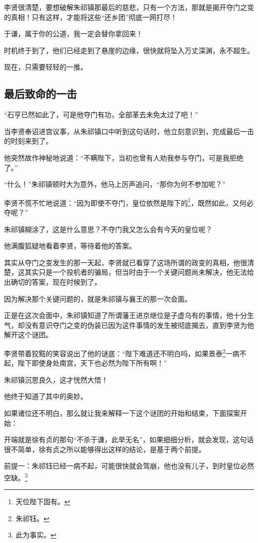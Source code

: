 \begin{multicols}{\theparacolNo}
李贤很清楚，要想破解朱祁镇那最后的慈悲，只有一个方法，那就是揭开夺门之变的真相！只有这样，才能将这些“还乡团”彻底一网打尽！

于谦，属于你的公道，我一定会替你拿回来！

时机终于到了，他们已经走到了悬崖的边缘，很快就将坠入万丈深渊，永不超生。

现在，只需要轻轻的一推。

\subsection{最后致命的一击}
“石亨已然如此了，可是他夺门有功，全部革去未免太过了吧！”

当李贤奉诏进宫议事，从朱祁镇口中听到这句话时，他立刻意识到，完成最后一击的时刻来到了。

他突然故作神秘地说道：“不瞒陛下，当初也曾有人劝我参与夺门，可是我拒绝了。”

“什么！”朱祁镇顿时大为意外，他马上厉声追问，“那你为何不参加呢？”

李贤不慌不忙地说道：“因为即使不夺门，皇位依然是陛下的\footnote{天位陛下固有。}，既然如此，又何必夺呢？”

朱祁镇糊涂了，这是什么意思？不夺门我又怎么会有今天的皇位呢？

他满腹狐疑地看着李贤，等待着他的答案。

其实从夺门之变发生的那一天起，李贤就已看穿了这场所谓的政变的真相，他很清楚，这其实只是一个投机者的骗局，但当时由于一个关键问题尚未解决，他无法给出确切的答案，现在时候到了。

因为解决那个关键问题的，就是朱祁镇与襄王的那一次会面。

正是在这次会面中，朱祁镇知道了所谓藩王进京继位是子虚乌有的事情，他十分生气，却没有意识夺门之变的伪装已因为这件事情的发生被彻底揭去，直到李贤为他解开这个谜团。

李贤带着狡黠的笑容说出了他的谜底：“陛下难道还不明白吗，如果景泰\footnote{朱祁钰。}一病不起，陛下即使身处南宫，天下也必然为陛下所有啊！”

朱祁镇沉思良久，这才恍然大悟！

他终于知道了其中的奥妙。

如果诸位还不明白，那么就让我来解释一下这个谜团的开始和结束，下面探案开始：

开端就是徐有贞的那句“不杀于谦，此举无名”，如果细细分析，就会发现，这句话很不简单，徐有贞之所以能够得出这样的结论，是基于两个前提。

前提一：朱祁钰已经一病不起，可能很快就会驾崩，他也没有儿子，到时皇位必然空缺。\footnote{此为事实。}


\end{multicols}
